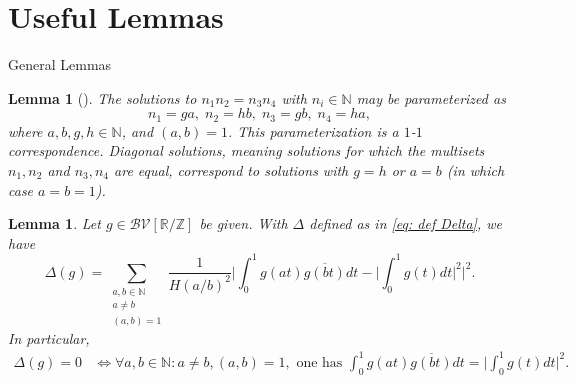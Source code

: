 \documentclass[12pt]{amsart}
\makeatletter
\renewcommand\subsection{\@startsection{subsection}{2}%
	\z@{1\linespacing\@plus1\linespacing}{\linespacing}%
	{\normalfont\bfseries\centering}}
\numberwithin{equation}{section}
\theoremstyle{plain}
\newtheorem{lem}[thm]{Lemma}
\theoremstyle{definition}
\newcommand{\N}{\mathbb{N}}
\newcommand{\Z}{\mathbb{Z}}
\newcommand{\R}{\mathbb{R}}
\newcommand{\CB}{\mathcal{B}}
\newcommand{\CV}{\mathcal{V}}
\makeatother
\begin{document}
	
	
	\section{Useful Lemmas}
	
	\subsection{General Lemmas}
	\begin{lem}[{\cite[Lemma 3.4]{sound-xu-CLT}}]\label{lem:parameterization}
		The solutions to $n_1n_2=n_3n_4$ with $n_i \in \N$ may be parameterized as
		$$n_1 = ga, \; n_2 = hb, \; n_3 = gb, \; n_4 = ha,$$
		where $a,b,g,h \in \N$, and $(a,b) = 1$. This parameterization is a $1$-$1$ correspondence. Diagonal solutions, meaning solutions for which the multisets ${n_1,n_2}$ and ${n_3,n_4}$ are equal, correspond to solutions with $g = h$ or $a = b$ (in which case $a = b = 1$).
	\end{lem}
	
\begin{lem}\label{prop simpl delta}
	Let $g \in \CB\CV[\R/\Z]$ be given. With $\Delta$ defined as in \eqref{eq: def Delta}, we have
	$$\Delta(g) = \sum_{\substack{a,b \in \N \\ a \ne b \\ (a,b) = 1}}\frac{1}{H(a/b)^2} \bigg|\int_0^1 g(at)\overline{g(bt)}dt - \Big|\int_0^1 g(t)dt\Big|^2\bigg|^2.$$
	In particular,
	\begin{align*}
		\Delta(g) = 0 & \iff \forall a,b \in \N: a \ne b, (a,b) = 1, \text{ one has } \int_0^1 g(at)\overline{g(bt)}dt =\Big|\int_0^1 g(t)dt\Big|^2.  
	\end{align*}
\end{lem}
\end{document}
